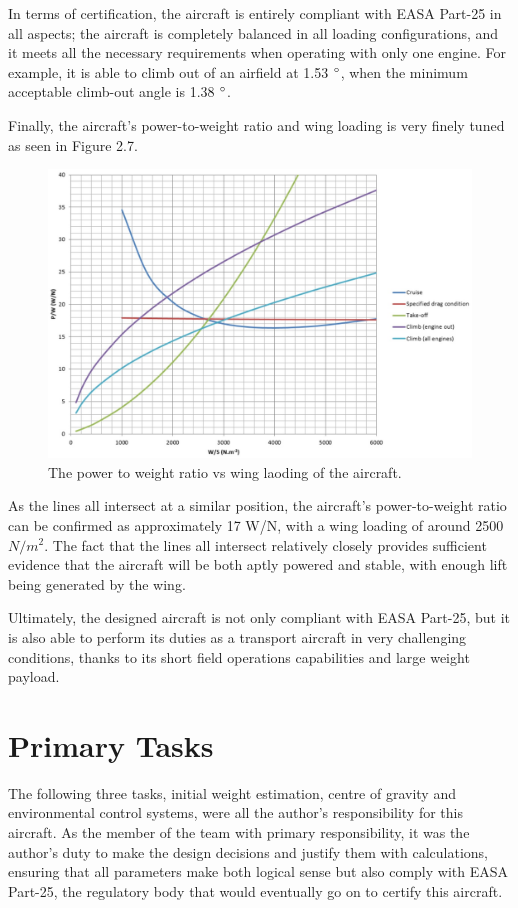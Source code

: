 \documentclass[stu, a4paper, 12pt, floatsintext]{apa7}
\numberwithin{figure}{section}
\numberwithin{table}{section}
\numberwithin{equation}{section}
\begin{document}
In terms of certification, the aircraft is entirely compliant with EASA Part-25 in all aspects; the aircraft is completely balanced in all loading configurations, and it meets all the necessary requirements when operating with only one engine. For example, it is able to climb out of an airfield at 1.53 $\degree$, when the minimum acceptable climb-out angle is 1.38 $\degree$. 

Finally, the aircraft’s power-to-weight ratio and wing loading is very finely tuned as seen in Figure 2.7.

\begin{figure}[H]
    \caption{The power to weight ratio vs wing laoding of the aircraft.}
    \label{fig:power_to_weight}
    \centering
    \includegraphics[width=1.1\textwidth]{pictures/power-to-weight.jpg}
\end{figure}

As the lines all intersect at a similar position, the aircraft’s power-to-weight ratio can be confirmed as approximately 17 W/N, with a wing loading of around 2500 $N/m^2$. The fact that the lines all intersect relatively closely provides sufficient evidence that the aircraft will be both aptly powered and stable, with enough lift being generated by the wing.  

Ultimately, the designed aircraft is not only compliant with EASA Part-25, but it is also able to perform its duties as a transport aircraft in very challenging conditions, thanks to its short field operations capabilities and large weight payload.      

\section{Primary Tasks}
The following three tasks, initial weight estimation, centre of gravity and environmental control systems, were all the author's responsibility for this aircraft. As the member of the team with primary responsibility, it was the author’s duty to make the design decisions and justify them with calculations, ensuring that all parameters make both logical sense but also comply with EASA Part-25, the regulatory body that would eventually go on to certify this aircraft.
\end{document}
